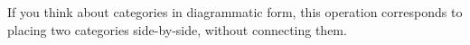 \begin{ctdefinition}
\begin{enumerate}
    \end{enumerate}
\end{ctdefinition}

\begin{remark}
    If you think about categories in diagrammatic form, this operation corresponds to placing two categories side-by-side, without connecting them.
\end{remark}

